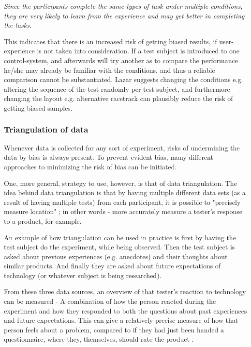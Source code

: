 \textit{Since the participants complete the same types of task under multiple conditions, they are very likely to learn from the experience and may get better in completing the tasks.}\parencite{Lazar2010}
\bigskip

This indicates that there is an increased risk of getting biased results, if user-experience is not taken into consideration. If a test subject is introduced to one control-system, and afterwards will try another as to compare the performance he/she may already be familiar with the conditions, and thus a reliable comparison cannot be substantiated. Lazar suggests changing the conditions e.g. altering the sequence of the test randomly per test subject, and furthermore changing the layout e.g. alternative racetrack can plausibly reduce the risk of getting biased samples. 


\subsubsection{Triangulation of data}
Whenever data is collected for any sort of experiment, risks of undermining the data by bias is always present. To prevent evident bias, many different approaches to minimizing the risk of bias can be initiated. 

One, more general, strategy to use, however, is that of data triangulation. The idea behind data triangulation is that by having multiple different data sets (as a result of having multiple tests) from each participant, it is possible to "precisely measure location" \parencite{Lazar2010}; 
in other words -  more accurately measure a tester's response to a product, for example.
\bigskip

An example of how triangulation can be used in practice is first by having the test subject do the experiment, while being observed. Then the test subject is asked about previous experiences (e.g. anecdotes) and their thoughts about similar products. And finally they are asked about future expectations of technology (or whatever subject is being researched).
\bigskip

From these three data sources, an overview of that tester's reaction to technology can be measured - A combination of how the person reacted during the experiment and how they responded to both the questions about past experiences and future expectations. This can give a relatively precise measure of how that person feels about a problem, compared to if they had just been handed a questionnaire, where they, themselves, should rate the product \parencite{Lazar2010}.
\bigskip


